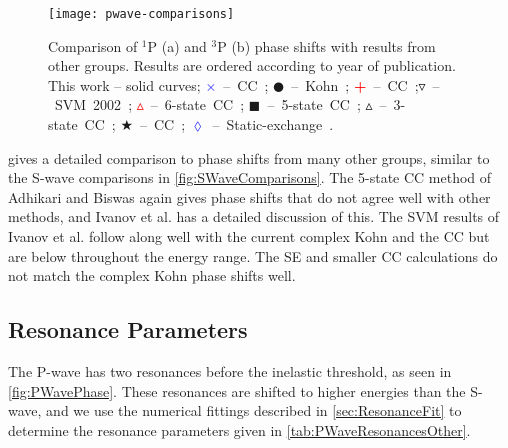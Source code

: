 \documentclass[Dissertation.tex]{subfiles}
\begin{document}
\begin{figure}
	\centering
	\texttt{[image: pwave-comparisons]}
	\caption[Comparison of P-wave phase shifts]{Comparison of $^1$P (a) and $^3$P (b) phase shifts with results from other groups. Results are ordered according to year of publication. This work -- solid curves; \mbox{\textcolor{blue}{$\times$} -- CC \cite{Walters2004};} \mbox{$\CIRCLE$ -- Kohn \cite{VanReeth2003};} \mbox{\textcolor{red}{\textbf{+}} -- CC \cite{Blackwood2002};}\mbox{$\triangledown$ -- SVM 2002 \cite{Ivanov2002};} \mbox{\textcolor{red}{$\vartriangle$} -- 6-state CC \cite{Sinha2000};} \mbox{$\blacksquare$ -- 5-state CC \cite{Adhikari1999};} \mbox{$\vartriangle$ -- 3-state CC \cite{Sinha1997};} \mbox{\textcolor[RGB]{0,127,0}{$\bigstar$} -- CC \cite{Ray1997};} \mbox{\textcolor{blue}{$\lozenge$} -- Static-exchange \cite{Hara1975}.}}
	\label{fig:PWaveComparisons}
\end{figure}

 gives a detailed comparison to phase shifts from 
many other groups, similar to the S-wave comparisons in
\cref{fig:SWaveComparisons}. The 5-state CC method of Adhikari and Biswas
\cite{Adhikari1999} again gives phase shifts that do not agree well with other 
methods, and Ivanov et al. \cite{Ivanov2002} has a detailed discussion of 
this. The SVM results of Ivanov et al. \cite{Ivanov2002} follow along well 
with the current complex Kohn and the CC \cite{Blackwood2002,Walters2004} but 
are below throughout the energy range. The SE
\cite{Hara1975,Ray1997} and smaller CC calculations \cite{Sinha1997} do not
match the complex Kohn phase shifts well.


\subsection{Resonance Parameters}
\label{sec:PWaveResonances}

The P-wave has two 
resonances before the inelastic threshold, as seen in \cref{fig:PWavePhase}. 
These resonances are shifted to higher energies than the
S-wave, and we use the numerical fittings described in \cref{sec:ResonanceFit}
to determine the resonance parameters given in \cref{tab:PWaveResonancesOther}.
\end{document}
